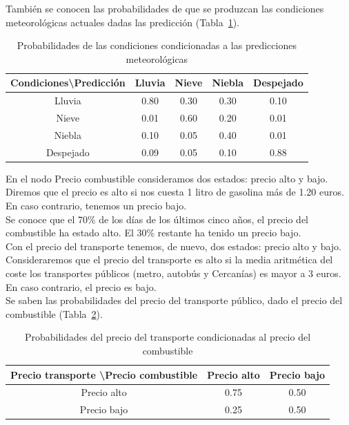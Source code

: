 \documentclass[12pt,a4paper,twoside,openright,titlepage,final]{article}
\begin{document}
También se conocen las probabilidades de que se produzcan las condiciones meteorológicas actuales dadas las predicción (Tabla~\ref{tbl:condicionadas}).

\begin{table}[htbp!]
	\centering
	\caption{Probabilidades de las condiciones condicionadas a las predicciones meteorológicas}
	\label{tbl:condicionadas}
	\begin{tabular}{@{}ccccc@{}}
		\toprule
		Condiciones\textbackslash Predicción & Lluvia & Nieve & Niebla & Despejado \\ \midrule
		Lluvia                               & 0.80   & 0.30  & 0.30   & 0.10      \\
		Nieve                                & 0.01   & 0.60  & 0.20   & 0.01      \\
		Niebla                               & 0.10   & 0.05  & 0.40   & 0.01      \\
		Despejado                            & 0.09   & 0.05  & 0.10   & 0.88      \\ \bottomrule
	\end{tabular}
\end{table} 

En el nodo Precio combustible consideramos dos estados: precio alto y bajo. Diremos que el precio es alto si nos cuesta 1 litro de gasolina más de 1.20 euros. En caso contrario, tenemos un precio bajo.\\

Se conoce que el 70\% de los días de los últimos cinco años, el precio del combustible ha estado alto. El 30\% restante ha tenido un precio bajo.\\

Con el precio del transporte tenemos, de nuevo, dos estados: precio alto y bajo. Consideraremos que el precio del transporte es alto si la media aritmética del coste los transportes públicos (metro, autobús y Cercanías) es mayor a 3 euros. En caso contrario, el precio es bajo.\\

Se saben las probabilidades del precio del transporte público, dado el precio del combustible (Tabla~\ref{tbl:condicionadas_2}).

\begin{table}[htbp!]
	\centering
	\caption{Probabilidades del precio del transporte condicionadas al precio del combustible}
	\label{tbl:condicionadas_2}
	\begin{tabular}{@{}ccc@{}}
		\toprule
		Precio transporte \textbackslash Precio combustible & Precio alto & Precio bajo \\ \midrule
		Precio alto                                         & 0.75        & 0.50        \\
		Precio bajo                                         & 0.25        & 0.50        \\ \bottomrule
	\end{tabular}
\end{table}
\end{document}
